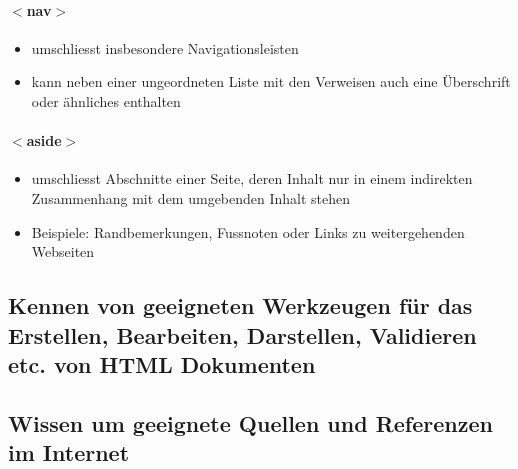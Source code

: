 \documentclass[10pt,a4paper]{article}
\begin{document}
\paragraph{$<$nav$>$}
\begin{itemize}[noitemsep,topsep=0pt,leftmargin=*]
    \item umschliesst insbesondere Navigationsleisten
    \item kann neben einer ungeordneten Liste mit den Verweisen auch eine Überschrift oder ähnliches enthalten
\end{itemize}

\paragraph{$<$aside$>$}
\begin{itemize}[noitemsep,topsep=0pt,leftmargin=*]
    \item umschliesst Abschnitte einer Seite, deren Inhalt nur in einem indirekten Zusammenhang mit dem umgebenden Inhalt stehen
    \item Beispiele: Randbemerkungen, Fussnoten oder Links zu weitergehenden Webseiten
\end{itemize}


\subsection{Kennen von \textbf{geeigneten Werkzeugen} für das Erstellen, Bearbeiten, Darstellen, Validieren etc. von HTML Dokumenten}

\subsection{Wissen um geeignete \textbf{Quellen und Referenzen} im Internet}
\end{document}
